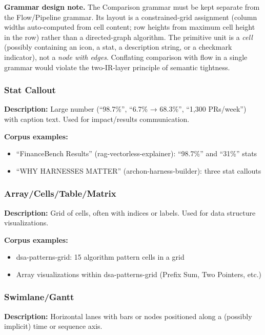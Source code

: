 \textbf{Grammar design note.}
The Comparison grammar must be kept separate from the Flow/Pipeline grammar.
Its layout is a constrained-grid assignment (column widths auto-computed from
cell content; row heights from maximum cell height in the row) rather than a
directed-graph algorithm.
The primitive unit is a \emph{cell} (possibly containing an icon, a stat, a
description string, or a checkmark indicator), not a \emph{node with edges}.
Conflating comparison with flow in a single grammar would violate the
two-IR-layer principle of semantic tightness.

\subsubsection{Stat Callout}

\textbf{Description:} Large number (``98.7\%'', ``6.7\% → 68.3\%'', ``1,300 PRs/week'') with caption text. Used for impact/results communication.

\textbf{Corpus examples:}
\begin{itemize}
  \item ``FinanceBench Results'' (rag-vectorless-explainer): ``98.7\%'' and ``31\%'' stats
  \item ``WHY HARNESSES MATTER'' (archon-harness-builder): three stat callouts
\end{itemize}

\subsubsection{Array/Cells/Table/Matrix}

\textbf{Description:} Grid of cells, often with indices or labels. Used for data structure visualizations.

\textbf{Corpus examples:}
\begin{itemize}
  \item dsa-patterns-grid: 15 algorithm pattern cells in a grid
  \item Array visualizations within dsa-patterns-grid (Prefix Sum, Two Pointers, etc.)
\end{itemize}

\subsubsection{Swimlane/Gantt}

\textbf{Description:} Horizontal lanes with bars or nodes positioned along a (possibly implicit) time or sequence axis.


